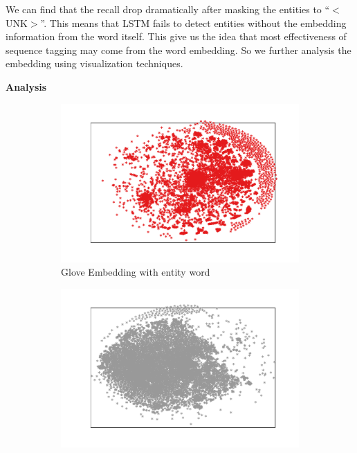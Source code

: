 \documentclass{article}
\begin{document}
We can find that the recall drop dramatically after masking the entities to ``$<$UNK$>$''. This means that LSTM fails to detect entities without the embedding information from the word itself. This give us the idea that most effectiveness of sequence tagging may come from the word embedding. So we further analysis the embedding using visualization techniques.

\noindent \textbf{Analysis}

\begin{figure}[t]
	\centering
	\begin{subfigure}{0.24\textwidth}
		\includegraphics[width=\linewidth]{glove_embedding_positive.pdf}
		\caption{Glove Embedding with entity word}
		\label{fig:glove_positive}
	\end{subfigure}\hfil 
	\begin{subfigure}{0.24\textwidth}
		\includegraphics[width=\linewidth]{glove_embedding_negative.pdf}

\end{subfigure}
\end{figure}
\end{document}
